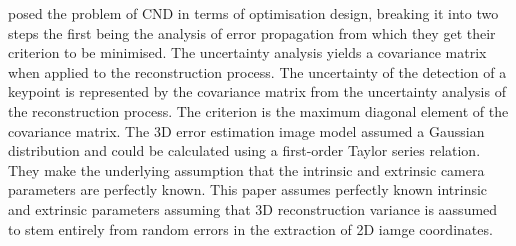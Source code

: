 \citet{olague2002optimal} posed the problem of CND in terms of optimisation design, breaking it into two steps the first being the analysis of error propagation from which they get their criterion to be minimised.
The uncertainty analysis yields a covariance matrix when applied to the reconstruction process.
The uncertainty of the detection of a keypoint is represented by the covariance matrix from the uncertainty analysis of the reconstruction process.
The criterion is the maximum diagonal element of the covariance matrix.
The 3D error estimation image model assumed a Gaussian distribution and could be calculated using a first-order Taylor series relation.
They make the underlying assumption that the intrinsic and extrinsic camera parameters are perfectly known.
This paper assumes perfectly known intrinsic and extrinsic parameters assuming that 3D reconstruction variance is aassumed to stem entirely from random errors in the extraction of 2D iamge coordinates.
